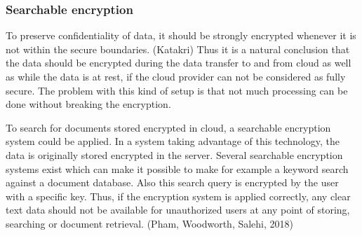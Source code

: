 \documentclass{article}
\begin{document}
\subsubsection{Searchable encryption}
To preserve confidentiality of data, it should be strongly encrypted whenever it is not within the secure boundaries. (Katakri) Thus it is a natural conclusion that the data should be encrypted during the data transfer to and from cloud as well as while the data is at rest, if the cloud provider can not be considered as fully secure. The problem with this kind of setup is that not much processing can be done without breaking the encryption.
\par
To search for documents stored encrypted in cloud, a searchable encryption system could be applied. In a system taking advantage of this technology, the data is originally stored encrypted in the server. Several searchable encryption systems exist which can make it possible to make for example a keyword search against a document database. Also this search query is encrypted by the user with a specific key. Thus, if the encryption system is applied correctly, any clear text data should not be available for unauthorized users at any point of storing, searching or document retrieval. (Pham, Woodworth, Salehi, 2018) 
\end{document}
